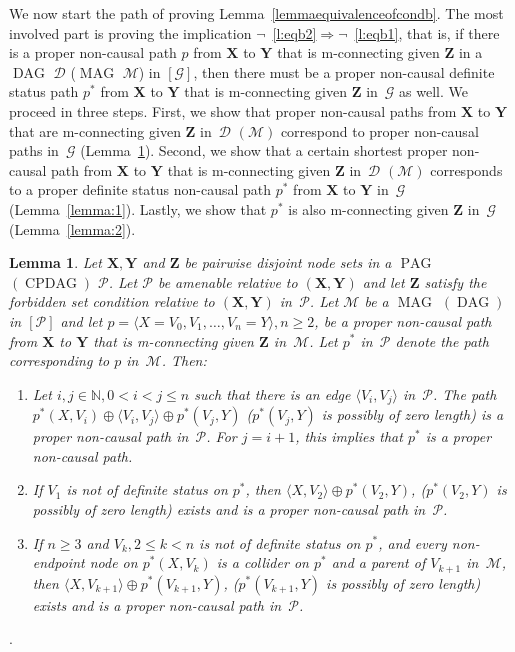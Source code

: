 \documentclass[11pt,a4paper]{article}
\newtheorem{lemma}[definition]{Lemma}
\DeclareMathOperator{\CPDAG}{CPDAG}
\DeclareMathOperator{\DAG}{DAG}
\DeclareMathOperator{\MAG}{MAG}
\DeclareMathOperator{\PAG}{PAG}
\newcommand{\forb}{the forbidden set condition\xspace}
\newcommand{\g}[1][G]{\mathcal{#1}}
\newcommand{\pstar}[1][p]{{#1}^{*}}
\begin{document}
We now start the path of proving Lemma~\ref{lemmaequivalenceofcondb}. The most involved part is proving the implication $\neg$~\ref{l:eqb2}$\Rightarrow\neg$~\ref{l:eqb1}, that is,
if there is a proper non-causal path $p$ from $\mathbf{X}$ to $\mathbf{Y}$ that is m-connecting given $\mathbf{Z}$ in a $\DAG$ $\g[D]$ ($\MAG$ $\g[M]$) in $[\g]$,
then there must be a proper non-causal definite status path $\pstar[p]$ from $\mathbf{X}$ to $\mathbf{Y}$ that is m-connecting given $\mathbf{Z}$ in~$\g$ as well. We proceed in three steps. First, we show that proper non-causal
paths from $\mathbf{X}$ to $\mathbf{Y}$ that are m-connecting given $\mathbf{Z}$ in~$\g[D]$ $(\g[M])$ correspond to proper non-causal paths in~$\g$ (Lemma~\ref{lemma:non-causal path}). Second, we show that a certain shortest proper non-causal path from $\mathbf{X}$ to $\mathbf{Y}$ that is m-connecting given $\mathbf{Z}$ in~$\g[D]$ $(\g[M])$ corresponds to a proper definite status non-causal path $\pstar$ from $\mathbf{X}$ to $\mathbf{Y}$ in~$\g$ (Lemma~\ref{lemma:1}). Lastly, we show that $\pstar$ is also m-connecting given $\mathbf{Z}$ in~$\g$ (Lemma~\ref{lemma:2}).

\begin{lemma}
Let $\mathbf{X,Y}$ and $\mathbf{Z}$ be pairwise disjoint node sets in a $\PAG$ $(\CPDAG)$ $\g[P]$. Let $\g[P]$ be amenable relative to $(\mathbf{X,Y})$ and let $\mathbf{Z}$ satisfy \forb{} relative to $(\mathbf{X},\mathbf{Y})$ in~$\g[P]$. Let $\g[M]$ be a $\MAG$ $(\DAG)$ in $[\g[P]]$ and let $p = \langle X = V_{0}, V_{1},\dots ,V_{n} = Y \rangle, n \ge 2$, be a proper non-causal path from $\mathbf{X}$ to $\mathbf{Y}$ that is m-connecting given $\mathbf{Z}$ in~$\g[M]$. Let $\pstar$ in~$\g[P]$ denote the path corresponding to $p$ in~$\g[M]$. Then:

\begin{enumerate}[label=(\roman*)]
\item\label{l:ncp:a} Let $i,j \in \mathbb{N}, 0 < i < j \leq n$ such that there is an edge $\langle V_i, V_j \rangle$ in~$\g[P]$. The path $ \pstar(X,V_i) \oplus \langle V_i, V_j \rangle \oplus \pstar(V_j,Y)$ ($\pstar(V_j, Y)$ is possibly of zero length) is a proper non-causal path in~$\g[P]$. For $j=i+1$, this implies that $\pstar$ is a proper non-causal path.
\item\label{l:ncp:b} If $V_1$ is not of definite status on $\pstar$, then $\langle X,V_2 \rangle \oplus \pstar(V_2,Y)$, ($\pstar(V_2, Y)$ is possibly of zero length) exists and is a proper non-causal path in~$\g[P]$.
\item\label{l:ncp:c} If $n \ge 3$ and $V_k, 2 \leq k < n$ is not of definite status on $\pstar$, and every non-endpoint node on $\pstar(X,V_k)$ is a collider on $\pstar$ and a parent of $V_{k+1}$ in~$\g[M]$, then $\langle X,V_{k+1} \rangle \oplus \pstar(V_{k+1},Y)$, ($\pstar(V_{k+1}, Y)$ is possibly of zero length) exists and is a proper non-causal path in~$\g[P]$.
\end{enumerate}
\label{lemma:non-causal path}
\end{lemma}.
\end{document}
